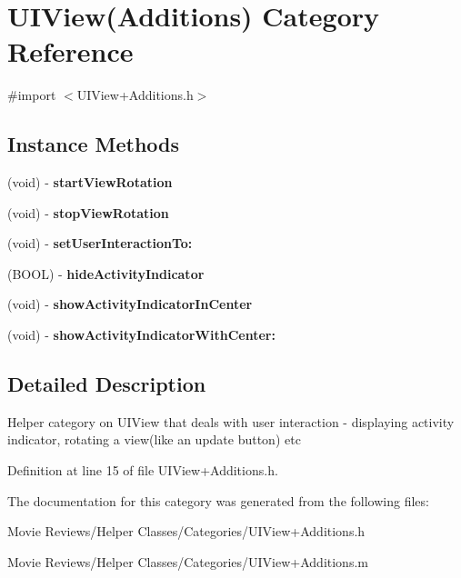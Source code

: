 \section{U\+I\+View(Additions) Category Reference}
\label{category_u_i_view_07_additions_08}


{\ttfamily \#import $<$U\+I\+View+\+Additions.\+h$>$}

\subsection*{Instance Methods}
\begin{DoxyCompactItemize}
\item 
(void) -\/ {\bfseries start\+View\+Rotation}\label{category_u_i_view_07_additions_08_a3bbafe7f60043748ed22f1f864a0a8a8}

\item 
(void) -\/ {\bfseries stop\+View\+Rotation}\label{category_u_i_view_07_additions_08_ad4dd78958ba2e53f2472746d945181c0}

\item 
(void) -\/ {\bfseries set\+User\+Interaction\+To\+:}\label{category_u_i_view_07_additions_08_a7ce9d78be1be5573b5ccd6e2e9e590c2}

\item 
(B\+O\+O\+L) -\/ {\bfseries hide\+Activity\+Indicator}\label{category_u_i_view_07_additions_08_ae20102d5d74ec51ef375ee9ccfa73db8}

\item 
(void) -\/ {\bfseries show\+Activity\+Indicator\+In\+Center}\label{category_u_i_view_07_additions_08_aa59dda0babca82363d80f52760bbaf66}

\item 
(void) -\/ {\bfseries show\+Activity\+Indicator\+With\+Center\+:}\label{category_u_i_view_07_additions_08_aa15eee1a8a1a1acb408c79308d4278b3}

\end{DoxyCompactItemize}


\subsection{Detailed Description}
Helper category on U\+I\+View that deals with user interaction -\/ displaying activity indicator, rotating a view(like an update button) etc 

Definition at line 15 of file U\+I\+View+\+Additions.\+h.



The documentation for this category was generated from the following files\+:\begin{DoxyCompactItemize}
\item 
Movie Reviews/\+Helper Classes/\+Categories/U\+I\+View+\+Additions.\+h\item 
Movie Reviews/\+Helper Classes/\+Categories/U\+I\+View+\+Additions.\+m\end{DoxyCompactItemize}
